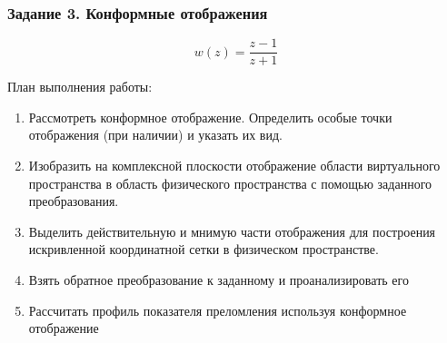\begin{frame}\frametitle{Задание 3. Конформные отображения}
	\begin{equation*}
		w(z) = \frac{z-1}{z+1}
	\end{equation*}

	План выполнения работы:
	\begin{enumerate}
		\item Рассмотреть конформное отображение.
		      Определить особые точки отображения (при наличии) и указать их вид.

		\item Изобразить на комплексной плоскости отображение
		      области виртуального пространства в область физического пространства
		      с помощью заданного преобразования.

		\item Выделить действительную и мнимую части отображения
		      для построения искривленной координатной сетки в физическом пространстве.

		\item Взять обратное преобразование к заданному и проанализировать его

		\item Рассчитать профиль показателя преломления используя конформное отображение

	\end{enumerate}
\end{frame}




